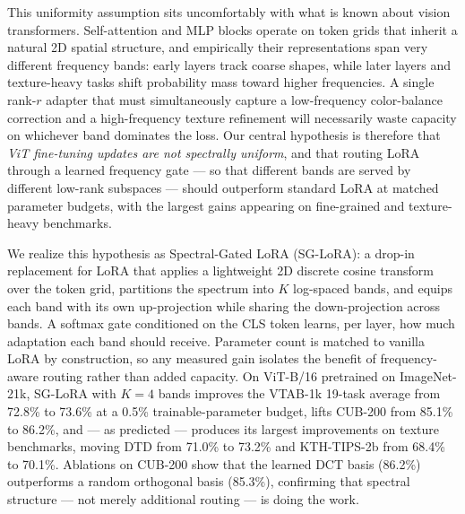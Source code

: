 \documentclass{article}
\begin{document}
This uniformity assumption sits uncomfortably with what is known about vision transformers. Self-attention and MLP blocks operate on token grids that inherit a natural 2D spatial structure, and empirically their representations span very different frequency bands: early layers track coarse shapes, while later layers and texture-heavy tasks shift probability mass toward higher frequencies. A single rank-$r$ adapter that must simultaneously capture a low-frequency color-balance correction and a high-frequency texture refinement will necessarily waste capacity on whichever band dominates the loss. Our central hypothesis is therefore that \emph{ViT fine-tuning updates are not spectrally uniform}, and that routing LoRA through a learned frequency gate --- so that different bands are served by different low-rank subspaces --- should outperform standard LoRA at matched parameter budgets, with the largest gains appearing on fine-grained and texture-heavy benchmarks.

We realize this hypothesis as Spectral-Gated LoRA (SG-LoRA): a drop-in replacement for LoRA that applies a lightweight 2D discrete cosine transform over the token grid, partitions the spectrum into $K$ log-spaced bands, and equips each band with its own up-projection while sharing the down-projection across bands. A softmax gate conditioned on the CLS token learns, per layer, how much adaptation each band should receive. Parameter count is matched to vanilla LoRA by construction, so any measured gain isolates the benefit of frequency-aware routing rather than added capacity. On ViT-B/16 pretrained on ImageNet-21k, SG-LoRA with $K=4$ bands improves the VTAB-1k 19-task average from 72.8\% to 73.6\% at a 0.5\% trainable-parameter budget, lifts CUB-200 from 85.1\% to 86.2\%, and --- as predicted --- produces its largest improvements on texture benchmarks, moving DTD from 71.0\% to 73.2\% and KTH-TIPS-2b from 68.4\% to 70.1\%. Ablations on CUB-200 show that the learned DCT basis (86.2\%) outperforms a random orthogonal basis (85.3\%), confirming that spectral structure --- not merely additional routing --- is doing the work.
\end{document}
